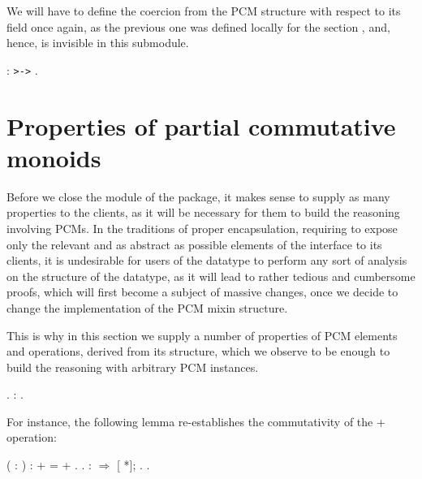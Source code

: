 We will have to define the coercion from the PCM structure with
respect to its  field once again, as the previous one was
defined locally for the section , and, hence, is invisible in
this submodule.


\begin{coqdoccode}
\coqdocemptyline
\coqdocnoindent
{}  :  \texttt{>->} .\coqdoceol
\coqdocemptyline
\end{coqdoccode}


\section{Properties of partial commutative monoids}




Before we close the  module of the  package, it makes
sense to supply as many properties to the clients, as it will be
necessary for them to build the reasoning involving PCMs. In the
traditions of proper encapsulation,  requiring
to expose only the relevant and as abstract as possible elements of
the interface to its clients, it is undesirable for users of the 
datatype to perform any sort of analysis on the structure of the
 datatype, as it will lead to rather tedious and cumbersome
proofs, which will first become a subject of massive changes, once we
decide to change the implementation of the PCM mixin structure.


This is why in this section we supply a number of properties of PCM
elements and operations, derived from its structure, which we observe
to be enough to build the reasoning with arbitrary PCM instances.


\begin{coqdoccode}
\coqdocemptyline
\coqdocnoindent
{} .\coqdoceol
\coqdocnoindent
{}  : .\coqdoceol
\coqdocemptyline
\end{coqdoccode}


For instance, the following lemma re-establishes the commutativity of
the + operation:


\begin{coqdoccode}
\coqdocemptyline
\coqdocnoindent
{}  (  : ) :  +  =  + .\coqdoceol
\coqdocnoindent
{}.\coqdoceol
\coqdocnoindent
{} :   \ensuremath{\Rightarrow}  [    *];  .\coqdoceol
\coqdocnoindent
{}.\coqdoceol
\coqdocemptyline
\end{coqdoccode}


